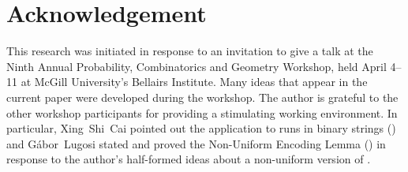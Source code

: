 \documentclass{patmorin}
\begin{document}
\section*{Acknowledgement}

This research was initiated in response to an invitation to give a
talk at the Ninth Annual Probability, Combinatorics and Geometry
Workshop, held April 4--11 at McGill University's Bellairs Institute.
Many ideas that appear in the current paper were developed during the
workshop. The author is grateful to the other workshop participants
for providing a stimulating working environment.  In particular,
Xing~Shi~Cai pointed out the application to runs in binary strings
() and G\'abor~Lugosi stated and proved the Non-Uniform
Encoding Lemma () in response to the author's half-formed
ideas about a non-uniform version of .

{}

\end{document}
